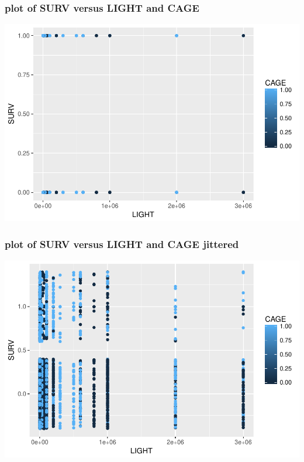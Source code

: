 \documentclass[handout]{beamer}\usepackage[]{graphicx}\usepackage[]{color}
\makeatletter
\def\maxwidth{ %
  \ifdim\Gin@nat@width>\linewidth
    \linewidth
  \else
    \Gin@nat@width
  \fi
}
\newenvironment{knitrout}{}{} %
\makeatother
\begin{document}
\begin{frame}[fragile]\frametitle{plot of SURV versus LIGHT and CAGE }

\begin{knitrout}
\color{fgcolor}
\includegraphics[width=\maxwidth]{figure/unnamed-chunk-3-1} 

\end{knitrout}
\end{frame}

\begin{frame}[fragile]\frametitle{plot of SURV versus LIGHT and CAGE jittered}

\begin{knitrout}
\color{fgcolor}
\includegraphics[width=\maxwidth]{figure/unnamed-chunk-4-1} 

\end{knitrout}
\end{frame}
\end{document}
